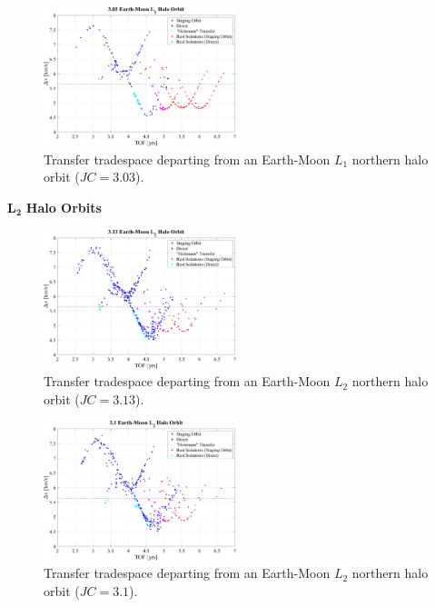 \begin{figure}[ht]
    \centering
    \includegraphics[width=0.5\textwidth]{figures/TradeSpace_L1Halo_3_03.pdf}
    \caption{Transfer tradespace departing from an Earth-Moon $L_{1}$ northern halo orbit ($JC=3.03$).}
\end{figure}
\clearpage

$\pmb{L_{2}}$ \textbf{Halo Orbits}
\begin{figure}[ht]
    \centering
    \includegraphics[width=0.5\textwidth]{figures/TradeSpace_L2Halo_3_13.pdf}
    \caption{Transfer tradespace departing from an Earth-Moon $L_{2}$ northern halo orbit ($JC=3.13$).}
\end{figure}

\begin{figure}[ht]
    \centering
    \includegraphics[width=0.5\textwidth]{figures/TradeSpace_L2Halo_3_10.pdf}
    \caption{Transfer tradespace departing from an Earth-Moon $L_{2}$ northern halo orbit ($JC=3.1$).}
\end{figure}
\clearpage

